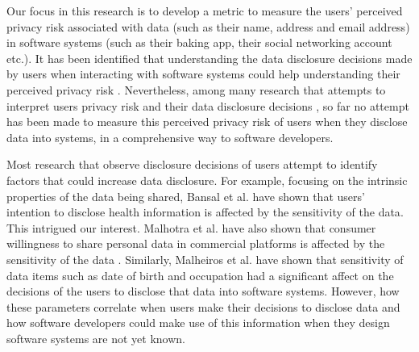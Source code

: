 \documentclass[10pt]{article}
\begin{document}
Our focus in this research is to develop a metric to measure the users' perceived privacy risk associated with data (such as their name, address and email address) in software systems (such as their baking app, their social networking account etc.). It has been identified that understanding the data disclosure decisions made by users when interacting with software systems could help understanding their perceived privacy risk \cite {kobsa2007privacy, li2010understanding, malhotra2004internet}. Nevertheless, among many research that attempts to interpret users privacy risk and their data disclosure decisions \cite {knijnenburg2013making, li2010understanding, wang2016context, malheiros2013fairly, dennett2000little}, so far no attempt has been made to measure this perceived privacy risk of users when they disclose data into systems, in a comprehensive way to software developers. 

Most research that observe disclosure decisions of users attempt to identify factors that could increase data disclosure. For example,  focusing on the intrinsic properties of the data being shared, Bansal et al. have shown that users' intention to disclose health information is affected by the sensitivity of the data\cite {bansal2010impact}. This intrigued our interest. Malhotra et al. have also shown that consumer willingness to share personal data in commercial platforms is affected by the sensitivity of the data \cite {malhotra2004internet}. Similarly, Malheiros et al. \cite {malheiros2013fairly} have shown that sensitivity of data items such as date of birth and occupation had a significant affect on the decisions of the users to disclose that data into software systems. However, how these parameters correlate when users make their decisions to disclose data and how software developers could make use of this information when they design software systems are not yet known. 
\end{document}
